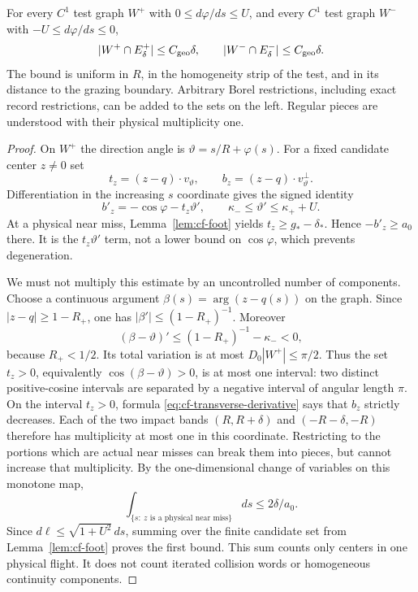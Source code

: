 \begin{theorem}
\label{thm:cf-transverse}
For every $C^1$ test graph $W^+$ with
$0\le d\varphi/ds\le U$, and every $C^1$ test graph $W^-$ with
$-U\le d\varphi/ds\le0$,
\begin{equation}\label{eq:cf-strip}
 |W^+\cap E_\delta^+|\le C_{\rm geo}\delta,
 \qquad |W^-\cap E_\delta^-|\le C_{\rm geo}\delta.
\end{equation}
The bound is uniform in $R$, in the homogeneity strip of the test,
and in its distance to the grazing boundary. Arbitrary Borel
restrictions, including exact record restrictions, can be added to
the sets on the left. Regular pieces are understood with their
physical multiplicity one.
\end{theorem}
\begin{proof}
On $W^+$ the direction angle is $\vartheta=s/R+\varphi(s)$.
For a fixed candidate center $z\ne0$ set
\[
 t_z=(z-q)\cdot v_\vartheta,\qquad
 b_z=(z-q)\cdot v_\vartheta^\perp.
\]
Differentiation in the increasing $s$ coordinate gives the signed
identity
\begin{equation}\label{eq:cf-transverse-derivative}
 b'_z=-\cos\varphi-t_z\vartheta',\qquad
 \kappa_-\le\vartheta'\le\kappa_++U.
\end{equation}
At a physical near miss, Lemma~\ref{lem:cf-foot} yields
$t_z\ge g_*-\delta_*$. Hence $-b'_z\ge a_0$ there. It is the
$t_z\vartheta'$ term, not a lower bound on $\cos\varphi$, which
prevents degeneration.

We must not multiply this estimate by an uncontrolled number of
components. Choose a continuous argument $\beta(s)=\arg(z-q(s))$
on the graph. Since $|z-q|\ge1-R_+$, one has
$|\beta'|\le(1-R_+)^{-1}$. Moreover
\[
 (\beta-\vartheta)'\le (1-R_+)^{-1}-\kappa_-<0,
\]
because $R_+<1/2$. Its total variation is at most
$D_0|W^+|\le\pi/2$. Thus the set $t_z>0$, equivalently
$\cos(\beta-\vartheta)>0$, is at most one interval: two distinct
positive-cosine intervals are separated by a negative interval of
angular length $\pi$. On the interval $t_z>0$, formula
\eqref{eq:cf-transverse-derivative} says that $b_z$ strictly decreases.
Each of the two impact bands $(R,R+\delta)$ and
$(-R-\delta,-R)$ therefore has multiplicity at most one in this
coordinate. Restricting to the portions which are actual near misses
can break them into pieces, but cannot increase that multiplicity.
By the one-dimensional change of variables on this monotone map,
\[
 \int_{\{s:\ z\text{ is a physical near miss}\}}ds
                 \le 2\delta/a_0.
\]
Since $d\ell\le\sqrt{1+U^2}\,ds$, summing over the finite candidate
set from Lemma~\ref{lem:cf-foot} proves the first bound. This sum
counts only centers in one physical flight. It does not count
iterated collision words or homogeneous continuity components.


\end{proof}
